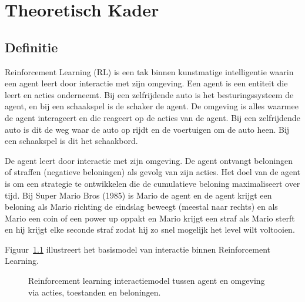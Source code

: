 \documentclass[a4paper,12pt]{report}
\begin{document}
\chapter{Theoretisch Kader}

\section{Definitie}
Reinforcement Learning (RL) is een tak binnen kunstmatige intelligentie waarin
een agent leert door interactie met zijn omgeving. Een agent is een entiteit
die leert en acties onderneemt. Bij een zelfrijdende auto is het
besturingssysteem de agent, en bij een schaakspel is de schaker de agent. De
omgeving is alles waarmee de agent interageert en die reageert op de acties van
de agent. Bij een zelfrijdende auto is dit de weg waar de auto op rijdt en de
voertuigen om de auto heen. Bij een schaakspel is dit het schaakbord.

De agent leert door interactie met zijn omgeving. De agent ontvangt beloningen
of straffen (negatieve beloningen) als gevolg van zijn acties. Het doel van de
agent is om een strategie te ontwikkelen die de cumulatieve beloning
maximaliseert over tijd. Bij Super Mario Bros (1985) is Mario de agent en de
agent krijgt een beloning als Mario richting de eindslag beweegt (meestal naar
rechts) en als Mario een coin of een power up oppakt en Mario krijgt een straf
als Mario sterft en hij krijgt elke seconde straf zodat hij zo snel mogelijk
het level wilt voltooien.

Figuur~\ref{fig:rl_model} illustreert het basismodel van interactie binnen
Reinforcement Learning.
\begin{figure}[h]
    \caption{Reinforcement learning interactiemodel tussen agent en omgeving via acties, toestanden en beloningen.}
    \label{fig:rl_model}
\end{figure}
\end{document}

